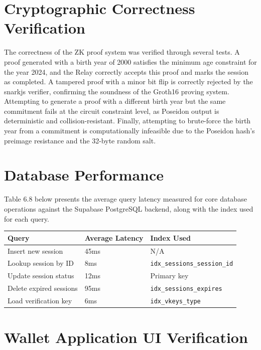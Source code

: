 \section{Cryptographic Correctness Verification}

The correctness of the ZK proof system was verified through several tests. A proof generated with a birth year of 2000 satisfies the minimum age constraint for the year 2024, and the Relay correctly accepts this proof and marks the session as completed. A tampered proof with a minor bit flip is correctly rejected by the snarkjs verifier, confirming the soundness of the Groth16 proving system. Attempting to generate a proof with a different birth year but the same commitment fails at the circuit constraint level, as Poseidon output is deterministic and collision-resistant. Finally, attempting to brute-force the birth year from a commitment is computationally infeasible due to the Poseidon hash's preimage resistance and the 32-byte random salt.

\section{Database Performance}

Table 6.8 below presents the average query latency measured for core database operations against the Supabase PostgreSQL backend, along with the index used for each query.

\begin{table}[H]
\begin{tabular}{|l|l|l|}
\hline
\textbf{Query} & \textbf{Average Latency} & \textbf{Index Used} \\
\hline
Insert new session & 45ms & N/A \\
Lookup session by ID & 8ms & \texttt{idx\_sessions\_session\_id} \\
Update session status & 12ms & Primary key \\
Delete expired sessions & 95ms & \texttt{idx\_sessions\_expires} \\
Load verification key & 6ms & \texttt{idx\_vkeys\_type} \\
\hline
\end{tabular}
\end{table}

\section{Wallet Application UI Verification}

